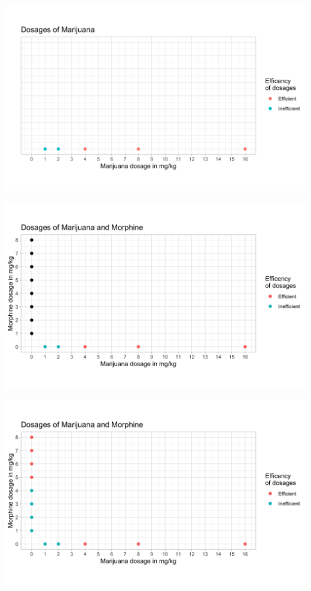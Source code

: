 \documentclass[14pt]{beamer}
\begin{document}
\begin{frame}
\begin{center}
\includegraphics[scale=0.24]{img2.png}
\end{center}
\end{frame}

\begin{frame}
\begin{center}
\includegraphics[scale=0.24]{img3.png}
\end{center}
\end{frame}

\begin{frame}
\begin{center}
\includegraphics[scale=0.24]{img4.png}
\end{center}
\end{frame}
\end{document}

